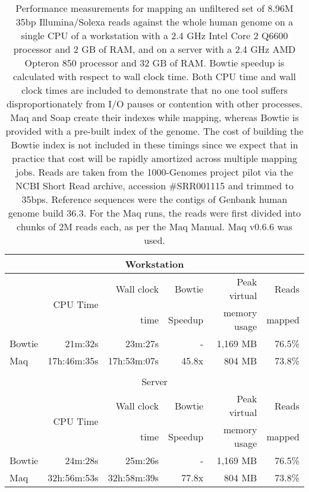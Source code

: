 \documentclass[letterpaper]{article}
\begin{document}
\begin{table}[tp]
\scriptsize
\begin{tabular}{lrrrrr}
\multicolumn{6}{c}{\small{Workstation}} \\[3pt]
\toprule
 & \multirow{2}{*}{CPU Time} & Wall clock & Bowtie  & Peak virtual & Reads  \\
 &                            & time       & Speedup & memory usage & mapped \\[3pt]
\toprule
Bowtie & 21m:32s & 23m:27s & - & 1,169 MB & 76.5\%\\\midrule
Maq & 17h:46m:35s & 17h:53m:07s & 45.8x & 804 MB & 73.8\%\\
\toprule\\[1pt]
\multicolumn{6}{c}{\small{Server}} \\[3pt]
\toprule
 & \multirow{2}{*}{CPU Time} & Wall clock & Bowtie  & Peak virtual & Reads  \\
 &                            & time       & Speedup & memory usage & mapped \\[3pt]
\toprule
Bowtie & 24m:28s & 25m:26s & - & 1,169 MB & 76.5\%\\\midrule
Maq & 32h:56m:53s & 32h:58m:39s & 77.8x & 804 MB & 73.8\%\\
\bottomrule
\end{tabular}
\caption{Performance measurements for mapping an unfiltered set of 8.96M 35bp
Illumina/Solexa reads
against the whole human genome on a single CPU of a workstation with a 2.4 GHz
Intel Core 2 Q6600 processor and 2 GB of RAM, and on a server with a 2.4 GHz
AMD Opteron 850 processor and 32 GB of RAM. Bowtie speedup is calculated with
respect to wall clock time. Both CPU time and wall clock times are included to
demonstrate that no one tool suffers disproportionately from I/O pauses or
contention with other processes. Maq and Soap create their indexes
while mapping, whereas Bowtie is provided with a pre-built index of the
genome.  The cost of building the Bowtie index is not included in these timings
since we expect that in practice that cost will be rapidly amortized across
multiple mapping jobs. Reads are taken from the 1000-Genomes project pilot via
the NCBI Short Read archive, accession \#SRR001115 and trimmed to 35bps.
Reference sequences were the contigs of Genbank human genome build 36.3. For
the Maq runs, the reads were first
divided into chunks of 2M reads each, as per the Maq Manual. Maq
v0.6.6 was used. }
\end{table}
\end{document}
